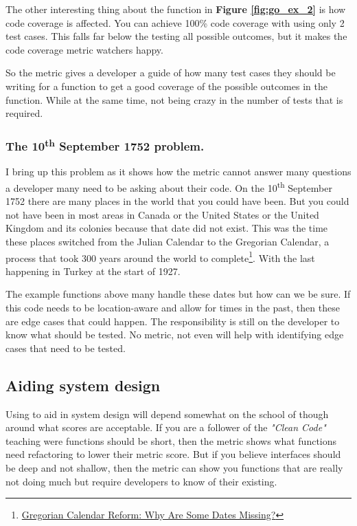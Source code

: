 The other interesting thing about the function in \textbf{Figure \ref{fig:go_ex_2}} is how code coverage is affected.
You can achieve 100\% code coverage with using only 2 test cases.
This falls far below the testing all possible outcomes, but it makes the code coverage metric watchers happy.

So the \cc metric gives a developer a guide of how many test cases they should be writing for a function to get a good coverage of the possible outcomes in the function.
While at the same time, not being crazy in the number of tests that is required.

\subsubsection{The 10\textsuperscript{th} September 1752 problem.}

I bring up this problem as it shows how the \cc metric cannot answer many questions a developer many need to be asking about their code.
On the 10\textsuperscript{th} September 1752 there are many places in the world that you could have been.
But you could not have been in most areas in Canada or the United States or the United Kingdom and its colonies because that date did not exist.
This was the time these places switched from the Julian Calendar to the Gregorian Calendar, a process that took 300 years around the world to complete\footnote{\href{https://www.timeanddate.com/calendar/julian-gregorian-switch.html}{Gregorian Calendar Reform: Why Are Some Dates Missing?}}.
With the last happening in Turkey at the start of 1927.

The example functions above many handle these dates but how can we be sure.
If this code needs to be location-aware and allow for times in the past, then these are edge cases that could happen.
The responsibility is still on the developer to know what should be tested.
No metric, not even \cc will help with identifying edge cases that need to be tested.

\subsection{Aiding system design}

Using \cc to aid in system design will depend somewhat on the school of though around what scores are acceptable.
If you are a follower of the \textit{"Clean Code"} teaching were functions should be short, then the \cc metric shows what functions need refactoring to lower their metric score.
But if you believe interfaces should be deep and not shallow, then the metric can show you functions that are really not doing much but require developers to know of their existing.

